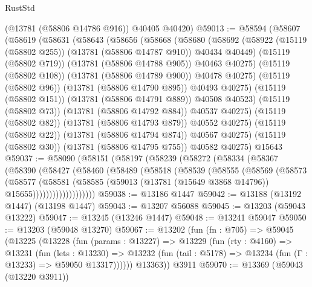 \begin{lexlean}{RustStd}
\begin{coremodule}
      (@13781 (@58806 @14786 @916))
      @40405
      @40420)
@59013 := @58594
    (@58607
      (@58619
        (@58631
          (@58643
            (@58656
              (@58668
                (@58680
                  (@58692
                    (@58922 (@15119 (@58802 @255)) (@13781 (@58806 @14787 @910)) @40434 @40449)
                    (@15119 (@58802 @719))
                    (@13781 (@58806 @14788 @905))
                    @40463
                    @40275)
                  (@15119 (@58802 @108))
                  (@13781 (@58806 @14789 @900))
                  @40478
                  @40275)
                (@15119 (@58802 @96))
                (@13781 (@58806 @14790 @895))
                @40493
                @40275)
              (@15119 (@58802 @151))
              (@13781 (@58806 @14791 @889))
              @40508
              @40523)
            (@15119 (@58802 @73))
            (@13781 (@58806 @14792 @884))
            @40537
            @40275)
          (@15119 (@58802 @82))
          (@13781 (@58806 @14793 @879))
          @40552
          @40275)
        (@15119 (@58802 @22))
        (@13781 (@58806 @14794 @874))
        @40567
        @40275)
      (@15119 (@58802 @30))
      (@13781 (@58806 @14795 @755))
      @40582
      @40275)
    @15643
@59037 := @58090
    (@58151
      (@58197
        (@58239
          (@58272
            (@58334
              (@58367
                (@58390
                  (@58427
                    (@58460
                      (@58489
                        (@58518
                          (@58539
                            (@58555
                              (@58569
                                (@58573
                                  (@58577
                                    (@58581
                                      (@58585
                                        (@59013
                                          (@13781 (@15649 @3868 @14796))
                                          @15655)))))))))))))))))))
@59038 := @13186 @1447
@59042 := @13188 (@13192 @1447) (@13198 @1447)
@59043 := @13207 @56088
@59045 := @13203 (@59043 @13222)
@59047 := @13245 (@13246 @1447)
@59048 := @13241 @59047
@59050 := @13203 (@59048 @13270)
@59067 := @13202
    (fun (fn : @705) =>
    @59045
      (@13225
        (@13228
          (fun (params : @13227) =>
          @13229
            (fun (rty : @4160) =>
            @13231
              (fun (lets : @13230) =>
              @13232 (fun (tail : @5178) => @13234 (fun (Γ : @13233) => @59050 @13317))))))
        @13363))
    @3911
@59070 := @13369 (@59043 (@13220 @3911))

\end{coremodule}
\end{lexlean}
